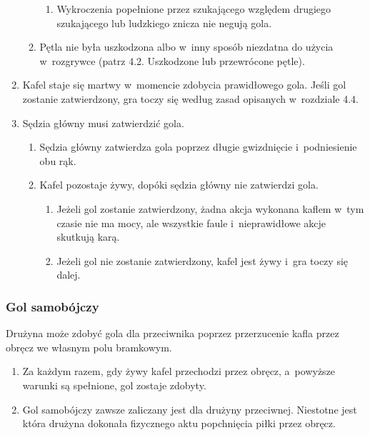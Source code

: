 \documentclass[12pt]{article}
\begin{document}
\begin{enumerate}
\begin{enumerate}
		            \begin{enumerate}
			            \item
			                  Wykroczenia popełnione przez szukającego względem drugiego
			                  szukającego lub ludzkiego znicza nie negują gola.
		            \end{enumerate}
		      \item
		            Pętla nie była uszkodzona albo w~inny sposób niezdatna do użycia w~rozgrywce (patrz 4.2. Uszkodzone lub przewrócone pętle).
	      \end{enumerate}
	\item
	      Kafel staje się martwy w~momencie zdobycia prawidłowego gola. Jeśli
	      gol zostanie zatwierdzony, gra toczy się według zasad opisanych w~rozdziale 4.4.
	\item
	      Sędzia główny musi zatwierdzić gola.

	      \begin{enumerate}
		      \item
		            Sędzia główny zatwierdza gola poprzez długie gwizdnięcie i~podniesienie obu rąk.
		      \item
		            Kafel pozostaje żywy, dopóki sędzia główny nie zatwierdzi gola.

		            \begin{enumerate}
			            \item
			                  Jeżeli gol zostanie zatwierdzony, żadna akcja wykonana kaflem w~tym czasie nie ma mocy, ale wszystkie faule i~nieprawidłowe akcje
			                  skutkują karą.
			            \item
			                  Jeżeli gol nie zostanie zatwierdzony, kafel jest żywy i~gra toczy
			                  się dalej.
		            \end{enumerate}
	      \end{enumerate}
\end{enumerate}

\subsubsection{Gol samobójczy}
Drużyna może zdobyć gola dla
przeciwnika poprzez przerzucenie kafla przez obręcz we własnym polu
bramkowym.

\begin{enumerate}
	\item
	      Za każdym razem, gdy żywy kafel przechodzi przez obręcz, a~powyższe
	      warunki są spełnione, gol zostaje zdobyty.
	\item
	      Gol samobójczy zawsze zaliczany jest dla drużyny przeciwnej. Niestotne
	      jest która drużyna dokonała fizycznego aktu popchnięcia piłki przez
	      obręcz.
\end{enumerate}
\end{document}
